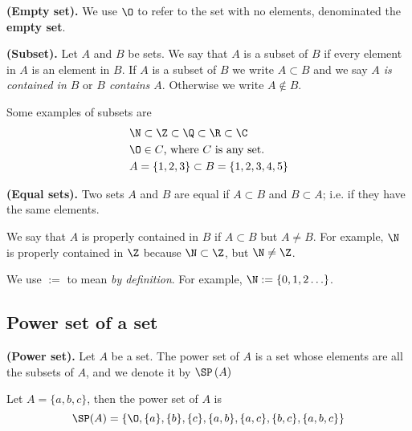 \begin{definition}
    \textbf{(Empty set).} We use $\O$ to refer to the set with no elements, denominated the \textbf{empty set}.
\end{definition}
\begin{definition}
    \textbf{(Subset).} Let $A$ and $B$ be sets. We say that $A$ is a subset of $B$ if every element in $A$ is an element in $B$. If $A$ is a subset of $B$ we write $A\subset B$ and we say \textit{$A$ is contained in $B$} or \textit{$B$ contains $A$}. Otherwise we write $A\notin B$.
\end{definition}
\begin{example}
    Some examples of subsets are
    \begin{align}
        &\N\subset\Z\subset\Q\subset\R\subset\C \\
        &\O\in C\textrm{, where $C$ is any set.} \\
        &A = \{1, 2, 3\} \subset B = \{1, 2, 3, 4, 5\} 
    \end{align}
\end{example}

\begin{definition}
    \textbf{(Equal sets).} Two sets $A$ and $B$ are equal if $A \subset B$ and $B\subset A$; i.e. if they have the same elements.
\end{definition}
\begin{definition}
    We say that $A$ is properly contained in $B$ if $A\subset B$ but $A\neq B$. For example, $\N$ is properly contained in $\Z$ because $\N\subset\Z$, but $\N\neq\Z$.
\end{definition}
\begin{notation}
    We use $:=$ to mean \textit{by definition}. For example, $\N := \{0, 1, 2\ldots\} $.
\end{notation}

\subsection{Power set of a set}
\begin{definition}
    \textbf{(Power set).} Let $A$ be a set. The power set of $A$ is a set whose elements are all the subsets of $A$, and we denote it by $\SP\left( A \right) $
\end{definition}
\begin{example}
    Let $A = \{a, b, c\}$, then the power set of $A$ is
    \begin{equation}
    \SP(A) = \lbrace \O, \{a\}, \{b\}, \{c\}, \{a, b\}, \{a, c\}, \{b, c\}, \{a, b, c\}\rbrace
    \end{equation}
\end{example}

